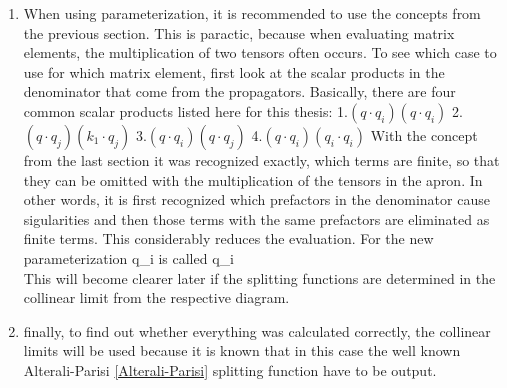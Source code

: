 \begin{enumerate}
\item When using parameterization, it is recommended to use the concepts from the previous section. This is paractic, because when evaluating matrix elements, the multiplication of two tensors often occurs. To see which case to use for which matrix element, first look at the scalar products in the denominator that come from the propagators. Basically, there are four common scalar products listed here for this thesis:
1.$ (q \cdot q_i)(q \cdot q_i) $
2.$ (q \cdot q_j)(k_1 \cdot q_j) $
3.$ (q \cdot q_i)(q \cdot q_j) $
4.$ (q \cdot q_i)(q_i \cdot q_i) $
With the concept from the last section it was recognized exactly, which terms are finite, so that they can be omitted with the multiplication of the tensors in the apron. In other words, it is first recognized which prefactors in the denominator cause sigularities and then those terms with the same prefactors are eliminated as finite terms. This considerably reduces the evaluation.  For the new parameterization q_i is called q_i
\\
This will become clearer later if the splitting functions are determined in the collinear limit from the respective diagram.
\item finally, to find out whether everything was calculated correctly, the collinear limits will be used because it is known that in this case the well known Alterali-Parisi \ref{Alterali-Parisi} splitting function have to be output.
\end{enumerate}
